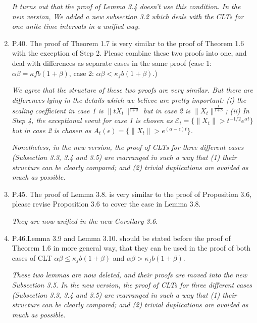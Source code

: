 \documentclass[12pt,a4paper]{amsart}
\begin{document}
\begin{enumerate}
  \emph{It turns out that the proof of Lemma 3.4 doesn't use this condition. In the new version, We added a new subsection 3.2 which deals with the CLTs for one unite time intervals in a unified way.}

\item
  P.40.
  The proof of Theorem 1.7 is very similar to the proof of Theorem 1.6 with the exception of Step 2.
  Please combine these two proofs into one, and deal with differences as separate cases in the same proof (case 1: $\alpha \beta = \kappa f b(1 + \beta)$, case 2: $\alpha \beta < \kappa_f b(1 + \beta)$.)

  \emph{We agree that the structure of these two proofs are very similar. But there are
differences lying in the details which we believe are pretty important:
(i) the scaling coefficient in case 1 is $\|tX_t\|^{\frac{1}{1+\beta}}$ but in case 2 is $\|X_t\|^{\frac{1}{1+\beta}}$;
 (ii) In Step 4, the exceptional event for case 1 is chosen as $\mathcal E_t = \{\|X_t\| > t^{-1/2} e^{\alpha t}\}$ but in case 2 is chosen as $ A_t(\epsilon) = \{\|X_t\|> e^{(\alpha - \epsilon )t}\}$. }

\emph{
    Nonetheless, in the new version, the proof of CLTs for three different cases (Subsection 3.3, 3.4 and 3.5) are rearranged in such a way that (1) their structure can be clearly compared; and (2) trivial duplications are avoided as much as possible.
}

\item
  P.45.
  The proof of Lemma 3.8. is very similar to the proof of Proposition 3.6, please revise Proposition 3.6 to cover the case in Lemma 3.8.

  \emph{They are now unified in the new Corollary 3.6.}

\item
  P.46.Lemma 3.9 and Lemma 3.10. should be stated before the proof of Theorem 1.6 in more general way, that they can be used in the proof of both cases of CLT $\alpha \beta \leq \kappa_f b(1 + \beta)$ and $\alpha \beta > \kappa_f b(1 + \beta).$

  \emph{These two lemmas are now deleted, and their proofs are moved into the new Subsection 3.5.
In the new version, the proof of CLTs for three different cases (Subsection 3.3, 3.4 and 3.5) are rearranged in such a way that (1) their structure can be clearly compared; and (2) trivial duplications are avoided as much as possible.}
\end{enumerate}
\end{document}
